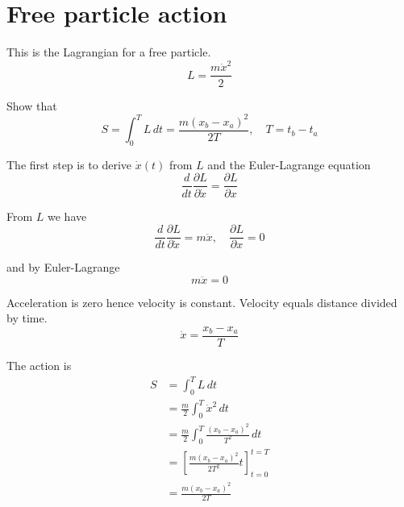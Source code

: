 

\section*{Free particle action}

This is the Lagrangian for a free particle.
\begin{equation*}
L=\frac{m\dot x^2}{2}
\end{equation*}

Show that
\begin{equation*}
S=\int_0^TL\,dt=\frac{m(x_b-x_a)^2}{2T},\quad T=t_b-t_a
\end{equation*}

The first step is to derive $\dot x(t)$ from $L$ and the Euler-Lagrange equation
\begin{equation*}
\frac{d}{dt}\frac{\partial L}{\partial\dot x}=\frac{\partial L}{\partial x}
\end{equation*}

From $L$ we have
\begin{equation*}
\frac{d}{dt}\frac{\partial L}{\partial\dot x}=m\ddot x,\quad
\frac{\partial L}{\partial x}=0
\end{equation*}

and by Euler-Lagrange
\begin{equation*}
m\ddot x=0
\end{equation*}

Acceleration is zero hence velocity is constant.
Velocity equals distance divided by time.
\begin{equation*}
\dot x=\frac{x_b-x_a}{T}
\end{equation*}

The action is
\begin{align*}
S&=\int_0^TL\,dt
\\
&=\frac{m}{2}\int_0^T\dot x^2\,dt
\\
&=\frac{m}{2}\int_0^T\frac{(x_b-x_a)^2}{T^2}\,dt
\\
&=\left[\frac{m(x_b-x_a)^2}{2T^2}t\right]_{t=0}^{t=T}
\\
&=\frac{m(x_b-x_a)^2}{2T}
\tag{1}
\end{align*}


